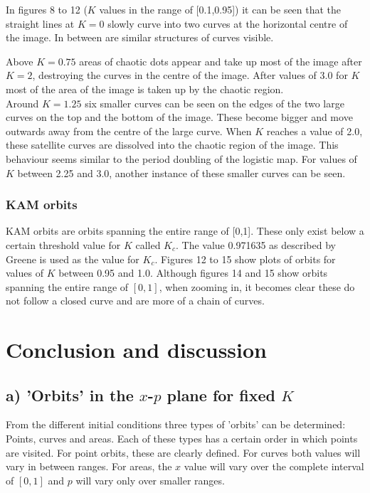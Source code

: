 \documentclass[a4paper,11pt]{article}
\begin{document}
In figures 8 to 12 ($K$ values in the range of [0.1,0.95]) it can be seen that the straight lines at $K = 0$ slowly curve into two curves at the horizontal centre of the image. In between are similar structures of curves visible.

Above  $K = 0.75$ areas of chaotic dots appear and take up most of the image after $K = 2$, destroying the curves in the centre of the image.
After values of 3.0 for $K$ most of the area of the image is taken up by the chaotic region.\\

Around $K = 1.25$ six smaller curves can be seen on the edges of the two large curves on the top and the bottom of the image. These become bigger and move outwards away from the centre of the large curve. When $K$ reaches a value of 2.0, these satellite curves are dissolved into the chaotic region of the image. This behaviour seems similar to the period doubling of the logistic map. For values of $K$ between 2.25 and 3.0, another instance of these smaller curves can be seen.

\subsubsection{KAM orbits}
KAM orbits are orbits spanning the entire range of [0,1]. These only exist below a certain threshold value for $K$ called $K_c$. The value 0.971635 as described by Greene\cite{kval} is used as the value for $K_c$. Figures 12 to 15 show plots of orbits for values of $K$ between 0.95 and 1.0. Although figures 14 and 15 show orbits spanning the entire range of $[0,1]$, when zooming in, it becomes clear these do not follow a closed curve and are more of a chain of curves.

\section{Conclusion and discussion}

\subsection{a) 'Orbits' in the $x$-$p$ plane for fixed $K$}
From the different initial conditions three types of 'orbits' can be determined: Points, curves and areas. Each of these types has a certain order in which points are visited. For point orbits, these are clearly defined. For curves both values will vary in between ranges. For areas, the $x$ value will vary over the complete interval of $[0,1]$ and $p$ will vary only over smaller ranges.
\end{document}
